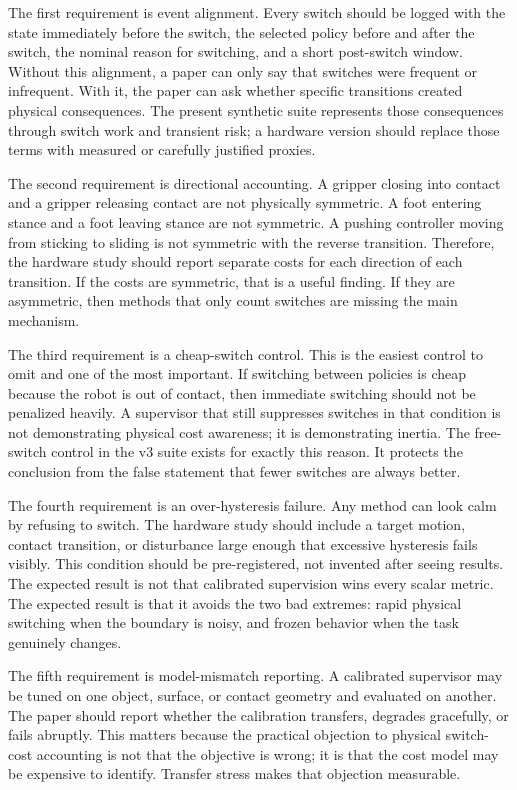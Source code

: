 \documentclass{article}
\begin{document}
The first requirement is event alignment.
Every switch should be logged with the state immediately before the switch, the selected policy before and after the switch, the nominal reason for switching, and a short post-switch window.
Without this alignment, a paper can only say that switches were frequent or infrequent.
With it, the paper can ask whether specific transitions created physical consequences.
The present synthetic suite represents those consequences through switch work and transient risk; a hardware version should replace those terms with measured or carefully justified proxies.

The second requirement is directional accounting.
A gripper closing into contact and a gripper releasing contact are not physically symmetric.
A foot entering stance and a foot leaving stance are not symmetric.
A pushing controller moving from sticking to sliding is not symmetric with the reverse transition.
Therefore, the hardware study should report separate costs for each direction of each transition.
If the costs are symmetric, that is a useful finding.
If they are asymmetric, then methods that only count switches are missing the main mechanism.

The third requirement is a cheap-switch control.
This is the easiest control to omit and one of the most important.
If switching between policies is cheap because the robot is out of contact, then immediate switching should not be penalized heavily.
A supervisor that still suppresses switches in that condition is not demonstrating physical cost awareness; it is demonstrating inertia.
The free-switch control in the v3 suite exists for exactly this reason.
It protects the conclusion from the false statement that fewer switches are always better.

The fourth requirement is an over-hysteresis failure.
Any method can look calm by refusing to switch.
The hardware study should include a target motion, contact transition, or disturbance large enough that excessive hysteresis fails visibly.
This condition should be pre-registered, not invented after seeing results.
The expected result is not that calibrated supervision wins every scalar metric.
The expected result is that it avoids the two bad extremes: rapid physical switching when the boundary is noisy, and frozen behavior when the task genuinely changes.

The fifth requirement is model-mismatch reporting.
A calibrated supervisor may be tuned on one object, surface, or contact geometry and evaluated on another.
The paper should report whether the calibration transfers, degrades gracefully, or fails abruptly.
This matters because the practical objection to physical switch-cost accounting is not that the objective is wrong; it is that the cost model may be expensive to identify.
Transfer stress makes that objection measurable.
\end{document}
